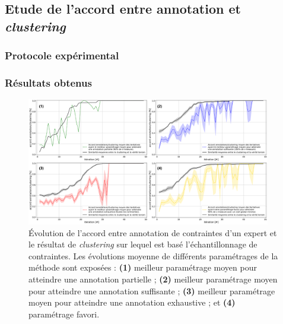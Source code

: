 	
	\subsection{Etude de l'accord entre annotation et \textit{clustering}}
	\label{section:4.5.1-ETUDE-RENTABILITE-ACCORD-ANNOTATION-CLUSTERING}
	
		\subsubsection{Protocole expérimental}
		

		\subsubsection{Résultats obtenus}
		
			
			\begin{figure}[!htb]
				\centering
				\includegraphics[width=0.95\textwidth]{figures/etude-rentabilite-accord-annotation}
				\caption{Évolution de l'accord entre annotation de contraintes d'un expert et le résultat de \textit{clustering} sur lequel est basé l'échantillonnage de contraintes.
				Les évolutions moyenne de différents paramétrages de la méthode sont exposées :
				\textbf{(1)} meilleur paramétrage moyen pour atteindre une annotation partielle ;
				\textbf{(2)} meilleur paramétrage moyen pour atteindre une annotation suffisante ;
				\textbf{(3)} meilleur paramétrage moyen pour atteindre une annotation exhaustive ;
				et \textbf{(4)} paramétrage favori.
				} 
				\label{figure:4.5.1-ETUDE-RENTABILITE-ACCORD-ANNOTATION-CLUSTERING}
			\end{figure}

